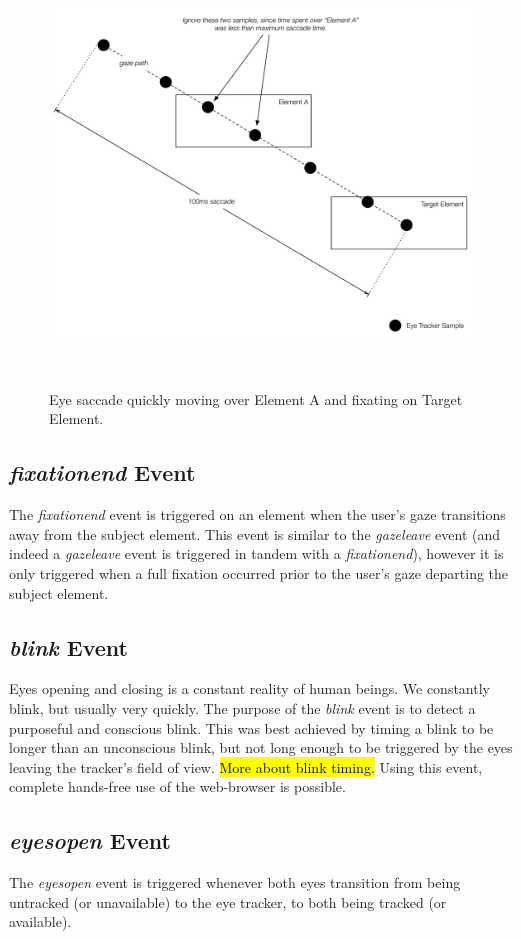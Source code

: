 \documentclass{sigchi}
\begin{document}
\begin{figure}
\centering
  \includegraphics[width=0.9\columnwidth]{figures/saccade.pdf}
  \caption{Eye saccade quickly moving over Element A and fixating on Target Element.}~\label{fig:saccade}
\end{figure}

\subsection{\textbf{\textit{fixationend}} Event}
The \textit{fixationend} event is triggered on an element when the user's gaze transitions away from the subject element. This event is similar to the \textit{gazeleave} event (and indeed a \textit{gazeleave} event is triggered in tandem with a \textit{fixationend}), however it is only triggered when a full fixation occurred prior to the user's gaze departing the subject element.

\subsection{\textbf{\textit{blink}} Event}
Eyes opening and closing is a constant reality of human beings. We constantly blink, but usually very quickly. The purpose of the \textit{blink} event is to detect a purposeful and conscious blink. This was best achieved by timing a blink to be longer than an unconscious blink, but not long enough to be triggered by the eyes leaving the tracker's field of view. \hl{More about blink timing.} Using this event, complete hands-free use of the web-browser is possible.

\subsection{\textbf{\textit{eyesopen}} Event}
The \textit{eyesopen} event is triggered whenever both eyes transition from being untracked (or unavailable) to the eye tracker, to both being tracked (or available).
\end{document}

